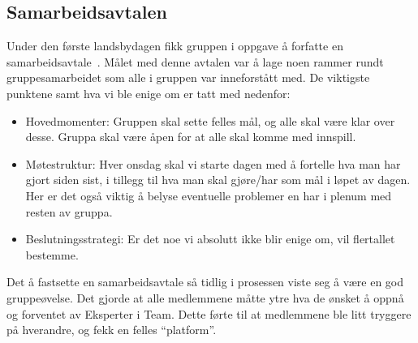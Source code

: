 \subsection{Samarbeidsavtalen}
Under den første landsbydagen fikk gruppen i oppgave å forfatte en
samarbeidsavtale~\cite{samarbeidsavtale}. Målet med denne avtalen var å
lage noen rammer rundt gruppesamarbeidet som alle i gruppen var
inneforstått med. De viktigste punktene samt hva vi ble enige om er tatt
med nedenfor:
\begin{itemize}
	\item Hovedmomenter: Gruppen skal sette felles mål, og alle skal
	være klar over desse.  Gruppa skal være åpen for at alle skal komme med
	innspill.
	\item Møtestruktur: Hver onsdag skal vi starte dagen med å fortelle
	hva man har gjort siden sist, i tillegg til hva man skal gjøre/har som
	mål i løpet av dagen. Her er det også viktig å belyse eventuelle
	problemer en har i plenum med resten av gruppa.
	\item Beslutningsstrategi: Er det noe vi absolutt ikke blir enige
	om, vil flertallet bestemme.
\end{itemize}
Det å fastsette en samarbeidsavtale så tidlig i prosessen viste seg å
være en god gruppeøvelse. Det gjorde at alle medlemmene måtte ytre hva
de ønsket å oppnå og forventet av Eksperter i Team. Dette førte til at
medlemmene ble litt tryggere på hverandre, og fekk en felles
``platform''.
